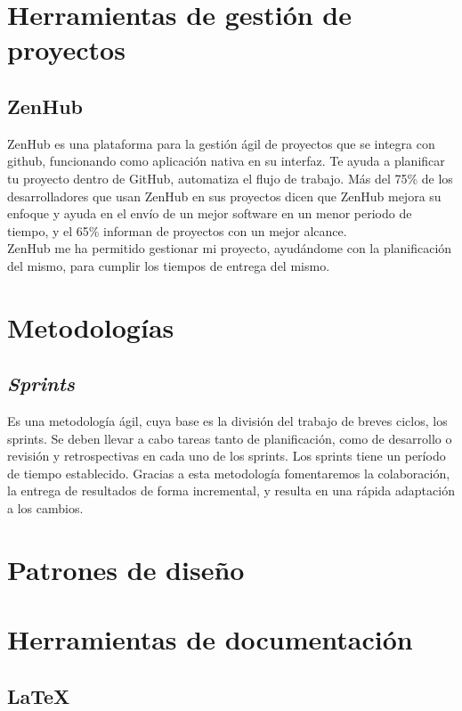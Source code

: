 \section{Herramientas de gestión de proyectos}

\subsection{ZenHub}

ZenHub es una plataforma para la gestión ágil de proyectos que se integra con github, funcionando como aplicación nativa en su interfaz. Te ayuda a planificar tu proyecto dentro de GitHub, automatiza el flujo de trabajo. Más del 75\% de los desarrolladores que usan ZenHub en sus proyectos dicen que ZenHub mejora su enfoque y ayuda en el envío de un mejor software en un menor periodo de tiempo, y el 65\% informan de proyectos con un mejor alcance.\\
ZenHub me ha permitido gestionar mi proyecto, ayudándome con la planificación del mismo, para cumplir los tiempos de entrega del mismo.

\section{Metodologías}

\subsection{\textit{Sprints}}
Es una metodología ágil, cuya base es la división del trabajo de breves ciclos, los sprints. Se deben llevar a cabo tareas tanto de planificación, como de desarrollo o revisión y retrospectivas en cada uno de los sprints. Los sprints tiene un período de tiempo establecido. Gracias a esta metodología fomentaremos la colaboración, la entrega de resultados de forma incremental, y resulta en una rápida adaptación a los cambios.

\section{Patrones de diseño}

\section{Herramientas de documentación}

\subsection{\LaTeX}

